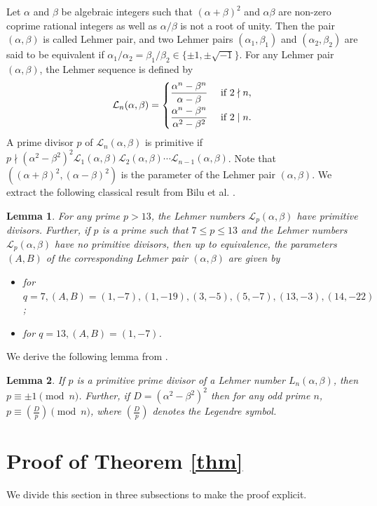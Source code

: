 \documentclass[12pt, 14paper,reqno]{amsart}
\theoremstyle{plain}
\newtheorem{lem}{Lemma}[section]
\theoremstyle{proof}
\numberwithin{equation}{section}
\begin{document}
Let $\alpha$ and $\beta$ be algebraic integers such that $(\alpha + \beta)^2$ and $\alpha\beta$ are non-zero coprime rational integers as well as $\alpha/\beta$ is not a root of unity. Then the pair $(\alpha, \beta)$ is called Lehmer pair, and two Lehmer pairs $(\alpha_1, \beta_1)$ and $(\alpha_2, \beta_2)$ are said to be equivalent if $\alpha_1/\alpha_2=\beta_1/\beta_2\in\{\pm 1, \pm\sqrt{-1}\}$. For any Lehmer pair $(\alpha, \beta)$, the Lehmer sequence is defined by  
$$\mathcal{L}_n(\alpha, \beta)=\begin{cases}
\dfrac{\alpha^n-\beta^n}{\alpha-\beta} & \text{ if } 2\nmid n, \vspace{1mm}\\
\dfrac{\alpha^n-\beta^n}{\alpha^2-\beta^2} & \text{ if } 2\mid n.
\end{cases}$$
A prime divisor $p$ of $\mathcal{L}_n(\alpha, \beta)$ is primitive if  $p\nmid(\alpha^2-\beta^2)^2
\mathcal{L}_1(\alpha, \beta) \mathcal{L}_2(\alpha, \beta) \cdots \mathcal{L}_{n-1}(\alpha, \beta)$. 
Note that $\left( (\alpha+\beta)^2, (\alpha-\beta)^2\right)$ is the parameter of the Lehmer pair $(\alpha, \beta)$. 
We extract the following classical result from Bilu et al. \cite[Theorem 1.4 and Tables 2, 4]{BH01}. 
\begin{lem}\label{lemBH}
For any prime $p>13$, the Lehmer numbers $\mathcal{L}_p (\alpha, \beta) $ have primitive divisors. Further, if $p$ is a prime such that $7\leq p\leq 13$ and the Lehmer numbers $\mathcal{L}_p(\alpha, \beta)$ have no primitive divisors, then up to equivalence, the parameters $(A, B)$ of the corresponding Lehmer pair $(\alpha, \beta)$ are given by  
\begin{itemize}
\item[(i)] for $q=7, (A, B)=(1,-7), (1, -19), (3, -5), (5, -7), (13, -3), (14, -22)$;  
\item[(ii)] for $q=13, (A, B)=(1,-7)$.
\end{itemize}
\end{lem}
We derive the following lemma from \cite{LE30,WA55}.
\begin{lem}\label{lemLE}
If $p$ is a primitive prime divisor of a Lehmer number $L_n(\alpha, \beta)$, then $p\equiv \pm 1 \pmod{n}$. Further, if $D=(\alpha^2-\beta^2)^2$ then for any odd prime $n$, $p\equiv \left(\frac{D}{p}\right)\pmod n$, where $\left(\frac{D}{p}\right)$
denotes the Legendre symbol.
\end{lem}

\section{Proof of Theorem \ref{thm}}\label{S3}
We divide this section in three subsections to make the proof explicit.  
\end{document}

